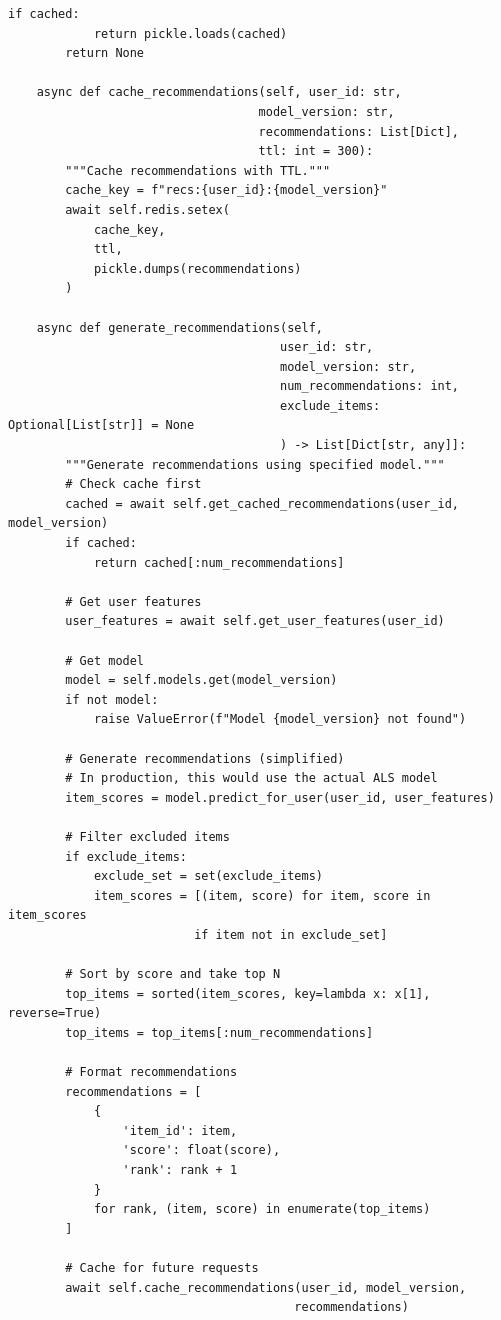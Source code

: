 \begin{lstlisting}[style=python, caption=FastAPI Serving with A/B Testing]
        if cached:
            return pickle.loads(cached)
        return None

    async def cache_recommendations(self, user_id: str,
                                   model_version: str,
                                   recommendations: List[Dict],
                                   ttl: int = 300):
        """Cache recommendations with TTL."""
        cache_key = f"recs:{user_id}:{model_version}"
        await self.redis.setex(
            cache_key,
            ttl,
            pickle.dumps(recommendations)
        )

    async def generate_recommendations(self,
                                      user_id: str,
                                      model_version: str,
                                      num_recommendations: int,
                                      exclude_items: Optional[List[str]] = None
                                      ) -> List[Dict[str, any]]:
        """Generate recommendations using specified model."""
        # Check cache first
        cached = await self.get_cached_recommendations(user_id, model_version)
        if cached:
            return cached[:num_recommendations]

        # Get user features
        user_features = await self.get_user_features(user_id)

        # Get model
        model = self.models.get(model_version)
        if not model:
            raise ValueError(f"Model {model_version} not found")

        # Generate recommendations (simplified)
        # In production, this would use the actual ALS model
        item_scores = model.predict_for_user(user_id, user_features)

        # Filter excluded items
        if exclude_items:
            exclude_set = set(exclude_items)
            item_scores = [(item, score) for item, score in item_scores
                          if item not in exclude_set]

        # Sort by score and take top N
        top_items = sorted(item_scores, key=lambda x: x[1], reverse=True)
        top_items = top_items[:num_recommendations]

        # Format recommendations
        recommendations = [
            {
                'item_id': item,
                'score': float(score),
                'rank': rank + 1
            }
            for rank, (item, score) in enumerate(top_items)
        ]

        # Cache for future requests
        await self.cache_recommendations(user_id, model_version,
                                        recommendations)


\end{lstlisting}
